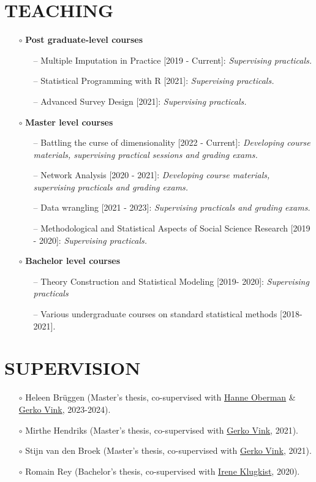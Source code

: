 \documentclass[11pt,a4paper,roman,colorlinks,linkcolor = blue]{moderncv}        %
\begin{document}
\section{TEACHING}
\begin{itemize}
\item[$\circ$] \textbf{Post graduate-level courses}
{\begin{itemize}
  \item[--] Multiple Imputation in Practice [2019 - Current]: \textit{Supervising practicals.}
  \item[--] Statistical Programming with R [2021]: \textit{Supervising practicals.}
  \item[--] Advanced Survey Design [2021]: \textit{Supervising practicals.}
   \end{itemize}
  }
  \item[$\circ$] \textbf{Master level courses}
  {\begin{itemize}
    \item[--] Battling the curse of dimensionality [2022 - Current]: \textit{Developing course materials, supervising practical sessions and grading exams.}
    \item[--] Network Analysis [2020 - 2021]: \textit{Developing course materials, supervising practicals and grading exams.}
    \item[--] Data wrangling [2021 - 2023]: \textit{Supervising practicals and grading exams.} 
    \item[--] Methodological and Statistical Aspects of Social Science Research [2019 - 2020]: \textit{Supervising practicals.}
   \end{itemize}
  }
  \item[$\circ$] \textbf{Bachelor level courses}
  {\begin{itemize}
    \item[--] Theory Construction and Statistical Modeling [2019- 2020]: \textit{Supervising practicals}
    \item[--] Various undergraduate courses on standard statistical methods [2018-2021].
   \end{itemize}
  }
\end{itemize}

\section{SUPERVISION}
\begin{itemize} 
  \item[$\circ$] Heleen Br{\"u}ggen (Master's thesis, co-supervised with \href{https://hanneoberman.github.io/}{Hanne Oberman} \& \href{https://www.gerkovink.com}{Gerko Vink}, 2023-2024).
  \item[$\circ$] Mirthe Hendriks (Master's thesis, co-supervised with \href{https://www.gerkovink.com}{Gerko Vink}, 2021).
  \item[$\circ$] Stijn van den Broek (Master's thesis, co-supervised with \href{https://www.gerkovink.com}{Gerko Vink}, 2021). 
  \item[$\circ$] Romain Rey (Bachelor's thesis, co-supervised with \href{https://www.uu.nl/medewerkers/iklugkist}{Irene Klugkist}, 2020). 
\end{itemize}
\end{document}
